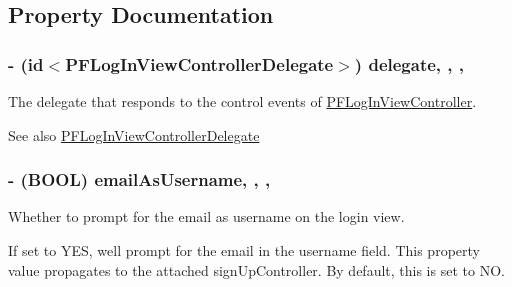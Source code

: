 \subsection{Property Documentation}
\hypertarget{interface_p_f_log_in_view_controller_aee5f26d00a8aa4fa970c0ee8edf18e5b}{}
\subsubsection[{delegate}]{\setlength{\rightskip}{0pt plus 5cm}-\/ (id$<${\bf P\+F\+Log\+In\+View\+Controller\+Delegate}$>$) delegate\hspace{0.3cm}{\ttfamily [read]}, {\ttfamily [write]}, {\ttfamily [nonatomic]}, {\ttfamily [weak]}}\label{interface_p_f_log_in_view_controller_aee5f26d00a8aa4fa970c0ee8edf18e5b}
The delegate that responds to the control events of {\ttfamily \hyperlink{interface_p_f_log_in_view_controller}{P\+F\+Log\+In\+View\+Controller}}.

\begin{DoxySeeAlso}{See also}
\hyperlink{protocol_p_f_log_in_view_controller_delegate-p}{P\+F\+Log\+In\+View\+Controller\+Delegate} 
\end{DoxySeeAlso}
\hypertarget{interface_p_f_log_in_view_controller_a26e4396d8e549640b53d2ec74d7f4a55}{}
\subsubsection[{email\+As\+Username}]{\setlength{\rightskip}{0pt plus 5cm}-\/ (B\+O\+O\+L) email\+As\+Username\hspace{0.3cm}{\ttfamily [read]}, {\ttfamily [write]}, {\ttfamily [nonatomic]}, {\ttfamily [assign]}}\label{interface_p_f_log_in_view_controller_a26e4396d8e549640b53d2ec74d7f4a55}
Whether to prompt for the email as username on the login view.

If set to {\ttfamily Y\+E\+S}, we\textquotesingle{}ll prompt for the email in the username field. This property value propagates to the attached {\ttfamily sign\+Up\+Controller}. By default, this is set to {\ttfamily N\+O}. \hypertarget{interface_p_f_log_in_view_controller_a5663b4bc64642b625eb8369bb09c1ff4}{}
